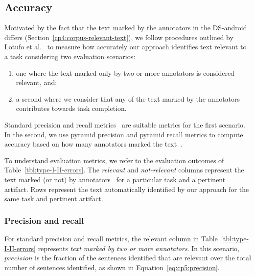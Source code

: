 \subsection{Accuracy}


Motivated by the fact that the text marked by the annotators in the \acs{DS-android} differs
(Section~\ref{cp4:corpus-relevant-text}),
we follow procedures outlined by Lotufo et al.~\cite{Lotufo2012}
to measure how accurately our approach identifies text relevant to a task considering two evaluation scenarios:


\begin{enumerate}
    \item one where the text marked only by two or more annotators is considered relevant, and;
    
    \item a second where we consider that any of the text marked by the annotators contributes towards task completion.
\end{enumerate}



Standard precision and recall metrics~\cite{Manning2009IR} are suitable metrics for the first scenario. In the second, we use pyramid precision and pyramid recall metrics
to compute accuracy based on how many annotators marked the text~\cite{Nenkova2004, Lotufo2012}. 



To understand evaluation metrics, we refer to the evaluation outcomes of Table~\ref{tbl:type-I-II-errors}. 
The \textit{relevant} and \textit{not-relevant} columns represent the text 
marked (or not) by annotators~\cite{Lotufo2012} for a particular task and a pertinent artifact. Rows represent the text automatically identified by our approach for the same task and pertinent artifact.





\subsubsection{Precision and recall}


For standard precision and recall metrics, the relevant column in Table~\ref{tbl:type-I-II-errors} represents \textit{text marked by two or more annotators}. 
In this scenario, $precision$ is the fraction of the sentences
 identified that are relevant over the total number of sentences identified, as shown in Equation~\ref{eq:cp5:precision}.


